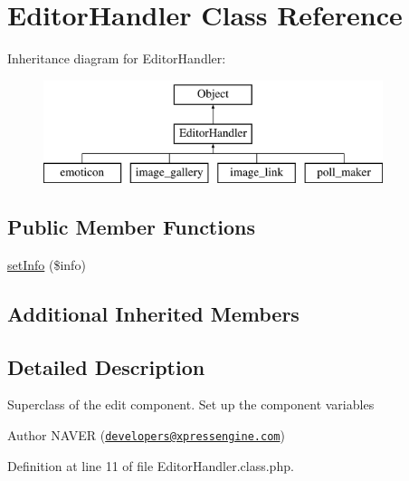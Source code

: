 \hypertarget{classEditorHandler}{\section{Editor\-Handler Class Reference}
\label{classEditorHandler}
}
Inheritance diagram for Editor\-Handler\-:\begin{figure}[H]
\begin{center}
\leavevmode
\includegraphics[height=3.000000cm]{classEditorHandler}
\end{center}
\end{figure}
\subsection*{Public Member Functions}
\begin{DoxyCompactItemize}
\item 
\hyperlink{classEditorHandler_af44daebb94e0ce9ca6ff5a792fb52023}{set\-Info} (\$info)
\end{DoxyCompactItemize}
\subsection*{Additional Inherited Members}


\subsection{Detailed Description}
Superclass of the edit component. Set up the component variables

\begin{DoxyAuthor}{Author}
N\-A\-V\-E\-R (\href{mailto:developers@xpressengine.com}{\tt developers@xpressengine.\-com}) 
\end{DoxyAuthor}


Definition at line 11 of file Editor\-Handler.\-class.\-php.



